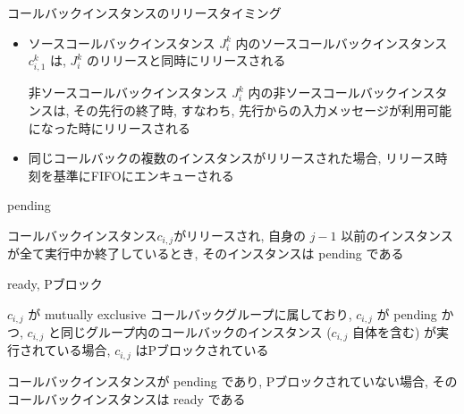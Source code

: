 \begin{frame}{コールバックインスタンスのリリースタイミング}
    \begin{itemize}
        \item {}
              \begin{block}{ソースコールバックインスタンス}
                  $J_{i}^{k}$ 内のソースコールバックインスタンス $c_{i, 1}^{k}$ は, $J_{i}^{k}$ のリリースと同時にリリースされる
              \end{block}
              \begin{block}{非ソースコールバックインスタンス}
                  $J_{i}^{k}$ 内の非ソースコールバックインスタンスは, その先行の終了時, すなわち, 先行からの入力メッセージが利用可能になった時にリリースされる
              \end{block}
              \vspace{5mm}
        \item 同じコールバックの複数のインスタンスがリリースされた場合, リリース時刻を基準にFIFOにエンキューされる
    \end{itemize}
\end{frame}

\begin{frame}{pending}
    \begin{definition}[pending]
        コールバックインスタンス$c_{i, j}$がリリースされ, 自身の $j-1$ 以前のインスタンスが全て実行中か終了しているとき, そのインスタンスは pending である
    \end{definition}
\end{frame}

\begin{frame}{ready, Pブロック}
    \begin{definition}[Pブロック]
        $c_{i, j}$ が mutually exclusive コールバックグループに属しており, $c_{i, j}$ が pending かつ, $c_{i, j}$ と同じグループ内のコールバックのインスタンス ($c_{i, j}$ 自体を含む) が実行されている場合, $c_{i, j}$ はPブロックされている
    \end{definition}
    \begin{definition}[ready]
        コールバックインスタンスが pending であり, Pブロックされていない場合, そのコールバックインスタンスは ready である
    \end{definition}
\end{frame}

